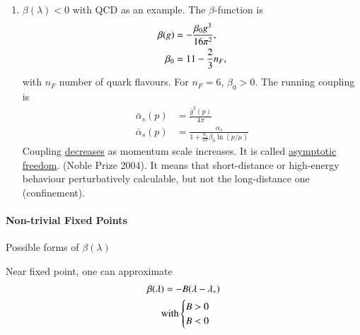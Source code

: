 \begin{enumerate}
\item $\beta(\lambda) < 0 $ with QCD as an example.
The $\beta$-function is
\begin{align}
   \beta(g) &= - \frac{\beta_0 g^3}{16 \pi^2}, \\
   \beta_0 &= 11 - \frac{2}{3} n_F, \notag
\end{align}
with $n_F$ number of quark flavours. For $n_F = 6$, $\beta_0 > 0$.
The running coupling is
\begin{align}
   \bar{\alpha}_s (p) &= \frac{\bar{g}^2 (p)}{4\pi} \\
   \bar{\alpha}_s(p) &= \frac{\alpha_s}{1 + \frac{\alpha_s}{2\pi}\beta_0 \ln (p / \mu)}
\end{align}
Coupling \underline{decreases} as momentum scale increases. It is called \underline{asymptotic freedom}. (Noble Prize 2004). It means that short-distance or high-energy behaviour perturbatively calculable, but not the long-distance one (confinement).
\end{enumerate}

\paragraph{Non-trivial Fixed Points}
Possible forms of $\beta(\lambda)$
\begin{center}
\end{center}


Near fixed point, one can approximate 
\begin{align}
  \beta(\lambda) = - B (\lambda - \lambda_*)  \\
  \text{with}
  \begin{cases}
     B > 0 \\
     B < 0
  \end{cases} \notag
\end{align}

